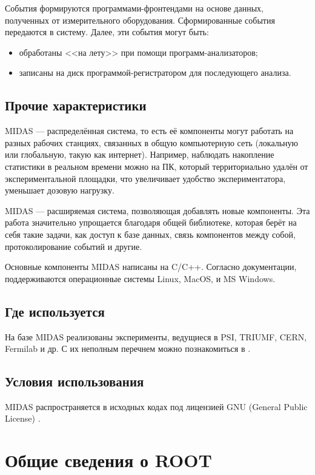 \documentclass[12pt, a4paper, oneside, onecolumn]{book}
\newcommand{\MIDAS}{\mbox{MIDAS}}
\newcommand{\ROOT}{\mbox{ROOT}}
\begin{document}
События формируются программами-фронтендами на основе данных, полученных от измерительного оборудования. Сформированные события передаются в систему. Далее, эти события могут быть:

\begin{itemize}
\item обработаны <<на лету>> при помощи программ-анализаторов;
\item записаны на диск программой-регистратором для последующего анализа.
\end{itemize}

\subsection{Прочие характеристики}

\MIDAS{} --- распределённая система, то есть её компоненты могут работать на разных рабочих станциях, связанных в общую компьютерную сеть (локальную или глобальную, такую как интернет). Например, наблюдать накопление статистики в реальном времени можно на ПК, который территориально удалён от экспериментальной площадки, что увеличивает удобство экспериментатора, уменьшает дозовую нагрузку.

\MIDAS{} --- расширяемая система, позволяющая добавлять новые компоненты. Эта работа значительно упрощается благодаря общей библиотеке, которая берёт на себя такие задачи, как доступ к базе данных, связь компонентов между собой, протоколирование событий и другие.

Основные компоненты \MIDAS{} написаны на C/C++. Согласно документации, поддерживаются операционные системы Linux, MacOS, и MS Windows.

\subsection{Где используется}

На базе \MIDAS{} реализованы эксперименты, ведущиеся в PSI, TRIUMF, CERN, Fermilab и др. С их неполным перечнем можно познакомиться в \cite{MidasWikiWorld}.

\subsection{Условия использования}

\MIDAS{} распространяется в исходных кодах под лицензией GNU (General Public License) \cite{midas}.

\section{Общие сведения о \ROOT{}}
\end{document}
